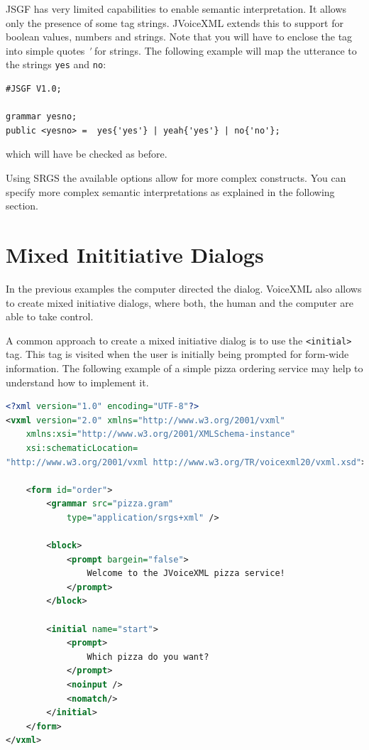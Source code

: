 \documentclass[11pt,a4paper]{book}
\begin{document}
JSGF has very limited capabilities to enable semantic interpretation.
It allows only the presence of some tag strings. JVoiceXML extends this to
support for boolean values, numbers and strings. Note that you will have to 
enclose the tag into simple quotes \emph{\'} for strings.
The following example will map the utterance to the strings \lstinline{yes}
and \lstinline{no}:
\begin{lstlisting}
#JSGF V1.0;

grammar yesno;
public <yesno> =  yes{'yes'} | yeah{'yes'} | no{'no'};
\end{lstlisting}
which will have be checked as before.

Using SRGS the available options allow for more complex constructs. You can
specify more complex semantic interpretations as explained in the following
section.

\section{Mixed Inititiative Dialogs}

In the previous examples the computer directed the dialog. VoiceXML also allows
to create mixed initiative dialogs, where both, the human and the computer
are able to take control.

A common approach to create a mixed initiative dialog is to use the
\lstinline{<initial>} tag.
This tag is visited when the user is initially being prompted for form-wide
information.
The following example of a simple pizza ordering service may help to understand
how to implement it.

\begin{lstlisting}[language=XML]
<?xml version="1.0" encoding="UTF-8"?>
<vxml version="2.0" xmlns="http://www.w3.org/2001/vxml"
    xmlns:xsi="http://www.w3.org/2001/XMLSchema-instance"
    xsi:schematicLocation=
"http://www.w3.org/2001/vxml http://www.w3.org/TR/voicexml20/vxml.xsd">

    <form id="order">
        <grammar src="pizza.gram"
            type="application/srgs+xml" />

        <block>
            <prompt bargein="false">
                Welcome to the JVoiceXML pizza service!
            </prompt>
        </block>

        <initial name="start">
            <prompt>
                Which pizza do you want?
            </prompt>
            <noinput />
            <nomatch/>
        </initial>
    </form>
</vxml>
\end{lstlisting}
\end{document}
